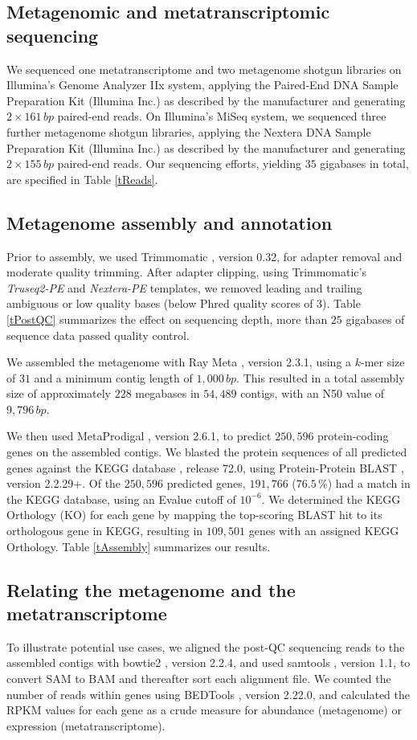 \documentclass{bmcart}
\begin{document}
\subsection*{Metagenomic and metatranscriptomic sequencing}
We sequenced one metatranscriptome and two metagenome shotgun libraries on Illumina's Genome Analyzer IIx system, applying the Paired-End DNA Sample Preparation Kit (Illumina Inc.) as described by the manufacturer and generating $2 \times 161\,bp$ paired-end reads.
On Illumina's MiSeq system, we sequenced three further metagenome shotgun libraries, applying the Nextera DNA Sample Preparation Kit (Illumina Inc.) as described by the manufacturer and generating $2 \times 155\,bp$ paired-end reads.
Our sequencing efforts, yielding $35$ gigabases in total, are specified in Table \ref{tReads}.

\subsection*{Metagenome assembly and annotation}
Prior to assembly, we used Trimmomatic \cite{Trimmomatic}, version 0.32, for adapter removal and moderate quality trimming.
After adapter clipping, using Trimmomatic's \emph{Truseq2-PE} and \emph{Nextera-PE} templates, we removed leading and trailing ambiguous or low quality bases (below Phred quality scores of 3).
Table \ref{tPostQC} summarizes the effect on sequencing depth, more than $25$ gigabases of sequence data passed quality control.

We assembled the metagenome with Ray Meta \cite{RayMeta}, version 2.3.1, using a $k$-mer size of $31$ and a minimum contig length of $1,000\,bp$.
This resulted in a total assembly size of approximately $228$ megabases in $54,489$ contigs, with an N50 value of $9,796\,bp$. %

We then used MetaProdigal \cite{MetaProdigal}, version 2.6.1, to predict $250,596$ protein-coding genes on the assembled contigs. We blasted the protein sequences of all predicted genes against the KEGG database \cite{KeggDB}, release 72.0, using Protein-Protein BLAST \cite{BlastPlus}, version 2.2.29+. 
Of the $250,596$ predicted genes, $191,766$ ($76.5\,\%$) had a match in the KEGG database, using an Evalue cutoff of $10^{-6}$.
We determined the KEGG Orthology (KO) for each gene by mapping the top-scoring BLAST hit to its orthologous gene in KEGG, resulting in $109,501$ genes with an assigned KEGG Orthology.
Table \ref{tAssembly} summarizes our results.

\subsection*{Relating the metagenome and the metatranscriptome}
To illustrate potential use cases, we aligned the post-QC sequencing reads to the assembled contigs with bowtie2 \cite{Bowtie2}, version 2.2.4, and used samtools \cite{Samtools}, version 1.1, to convert SAM to BAM and thereafter sort each alignment file. We counted the number of reads within genes using BEDTools \cite{BEDTools}, version 2.22.0, and calculated the RPKM values for each gene as a crude measure for abundance (metagenome) or expression (metatranscriptome).
\end{document}
